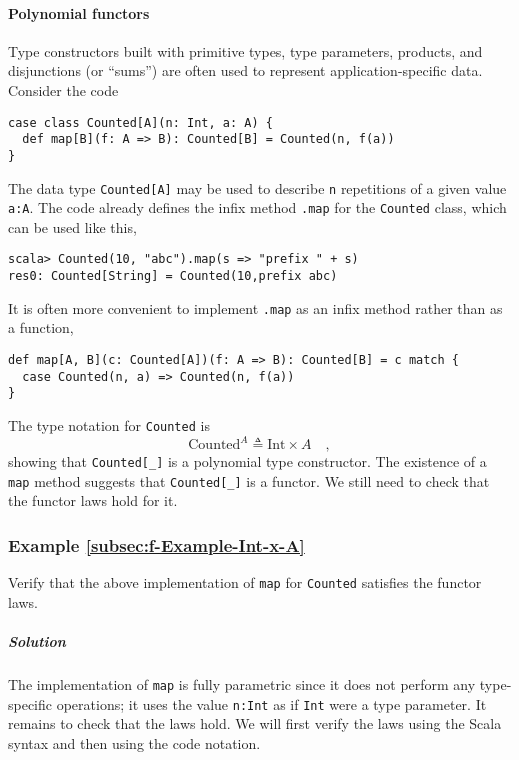 \paragraph{Polynomial functors}

Type constructors built with primitive types,
type parameters, products, and disjunctions (or ``sums'') are often
used to represent application-specific data. Consider the code
\begin{lstlisting}
case class Counted[A](n: Int, a: A) {
  def map[B](f: A => B): Counted[B] = Counted(n, f(a))
}
\end{lstlisting}
The data type \lstinline!Counted[A]! may be used to describe \lstinline!n!
repetitions of a given value \lstinline!a:A!. The code already defines
the infix method \lstinline!.map! for the \lstinline!Counted! class,
which can be used like this,
\begin{lstlisting}
scala> Counted(10, "abc").map(s => "prefix " + s)
res0: Counted[String] = Counted(10,prefix abc) 
\end{lstlisting}
It is often more convenient to implement \lstinline!.map! as an infix
method rather than as a function,
\begin{lstlisting}
def map[A, B](c: Counted[A])(f: A => B): Counted[B] = c match {
  case Counted(n, a) => Counted(n, f(a))
}
\end{lstlisting}

The type notation for \lstinline!Counted! is
\[
\text{Counted}^{A}\triangleq\text{Int}\times A\quad,
\]
showing that \lstinline!Counted[_]! is a polynomial
type constructor. The existence of a \lstinline!map! method suggests
that \lstinline!Counted[_]! is a functor. We still need to check
that the functor laws hold for it.

\subsubsection{Example \label{subsec:f-Example-Int-x-A}\ref{subsec:f-Example-Int-x-A}}

Verify that the above implementation of \lstinline!map! for \lstinline!Counted!
satisfies the functor laws. 

\subparagraph{Solution}

The implementation of \lstinline!map! is fully parametric since it
does not perform any type-specific operations; it uses the value \lstinline!n:Int!
as if \lstinline!Int! were a type parameter. It remains to check
that the laws hold. We will first verify the laws using the Scala
syntax and then using the code notation.

